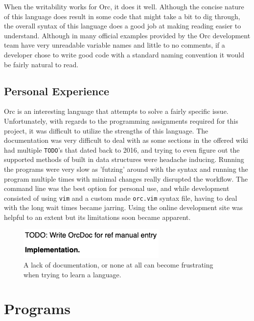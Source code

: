 \documentclass[12pt, letterpaper]{article}
\begin{document}
When the writability works for Orc, it does it well.  Although the concise nature of this language does result in some code that might take a bit to dig through, the overall syntax of this language does a good job at making reading easier to understand.  Although in many official examples provided by the Orc development team have very unreadable variable names and little to no comments, if a developer chose to write good code with a standard naming convention it would be fairly natural to read.

\subsection{Personal Experience}

Orc is an interesting language that attempts to solve a fairly specific issue.  Unfortunately, with regards to the programming assignments required for this project, it was difficult to utilize the strengths of this language.  The documentation was very difficult to deal with as some sections in the offered wiki had multiple \texttt{TODO}'s that dated back to 2016, and trying to even figure out the supported methods of built in data structures were headache inducing.  Running the programs were very slow as 'futzing' around with the syntax and running the program multiple times with minimal changes really disrupted the workflow.  The command line was the best option for personal use, and while development consisted of using \texttt{vim} and a custom made \texttt{orc.vim} syntax file, having to deal with the long wait times became jarring.  Using the online development site was helpful to an extent but its limitations soon became apparent.

\begin{figure}[b]
  \includegraphics{documentation.png}
  \caption{A lack of documentation, or none at all can become frustrating when trying to learn a language.}
\end{figure}

\newpage


\newpage

\section*{Programs}
\end{document}
